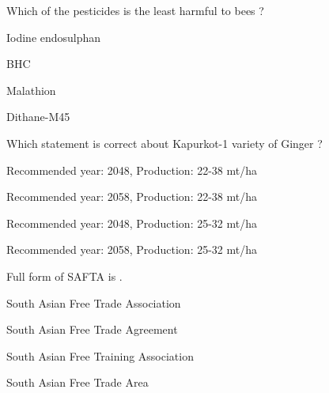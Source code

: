\begin{questions}
\question Which of the pesticides is the least harmful to bees ?
\begin{items}
\item* Iodine endosulphan
\item BHC
\item Malathion
\item Dithane-M45
\end{items}

\question Which statement is correct about Kapurkot-1 variety of Ginger ?
\begin{items}
\item Recommended year: 2048, Production: 22-38 mt/ha
\item* Recommended year: 2058, Production: 22-38 mt/ha
\item Recommended year: 2048, Production: 25-32 mt/ha
\item Recommended year: 2058, Production: 25-32 mt/ha
\end{items}

\question Full form of SAFTA is \fillin[][3cm].
\begin{items}
\item* South Asian Free Trade Association
\item South Asian Free Trade Agreement
\item South Asian Free Training Association
\item South Asian Free Trade Area
\end{items}

\end{questions}
